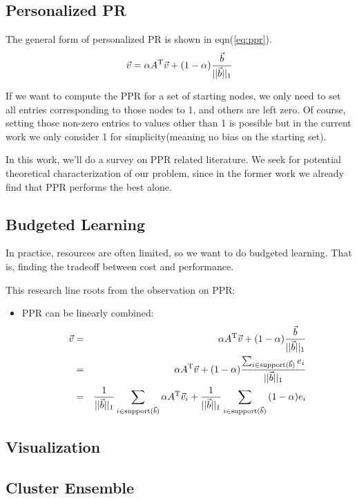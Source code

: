 \documentclass[11pt,a4paper]{article}
\begin{document}
\subsection{Personalized PR}

The general form of personalized PR is shown in eqn(\ref{eq:ppr}). 
\begin{equation}
	\vec{v} = \alpha A^{\rm T}\vec{v}
	+ (1-\alpha)\frac{\vec{b}}{||\vec{b}||_1}
	\label{eq:ppr}
\end{equation}

If we want to compute the PPR for a set of starting nodes, 
we only need to set all entries corresponding to those nodes 
to 1, and others are left zero. Of course, setting those non-zero
entries to values other than 1 is possible but in the current work 
we only consider 1 for simplicity(meaning no bias on the starting 
set). 

In this work, we'll do a survey on PPR related literature.
We seek for potential theoretical characterization of our problem, 
since in the former work we already find that PPR performs the best
alone. 

\subsection{Budgeted Learning}

In practice, resources are often limited, so we want to do 
budgeted learning. That is, finding the tradeoff between 
cost and performance. 

This research line roots from the observation on PPR:
\begin{itemize}
	\item PPR can be linearly combined:
\begin{eqnarray}
	\vec{v} &=& \alpha A^{\rm T}\vec{v}
	+ (1-\alpha)\frac{\vec{b}}{||\vec{b}||_1} \\
	&=& \alpha A^{\rm T}\vec{v}
	+ (1-\alpha)\frac{
	\sum_{i \in 
	\text{support($\vec{b}$)}}{e_i}}
	{||\vec{b}||_1} \\
	&=& \frac{1}{{||\vec{b}||_1}}
	\sum_{i \in \text{support($\vec{b}$)}}{\alpha A^{\rm T}\vec{v}_i}
	+
	\frac{1}{{||\vec{b}||_1}}
	\sum_{i \in \text{support($\vec{b}$)}}{(1-\alpha)e_i}
	\label{eq:ppr_linear} 
\end{eqnarray}
\end{itemize}


\subsection{Visualization}

\subsection{Cluster Ensemble}


\end{document}
